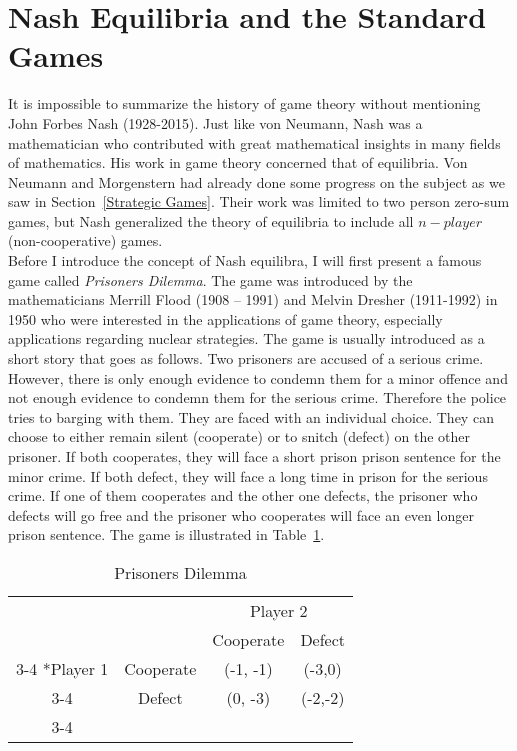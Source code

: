 \documentclass{article}
\theoremstyle{definition}
\theoremstyle{remark}
\begin{document}
\section{Nash Equilibria and the Standard Games}

It is impossible to summarize the history of game theory without
mentioning John Forbes Nash (1928-2015). Just like von Neumann, Nash
was a mathematician who contributed with great mathematical insights
in many fields of mathematics. His work in game theory concerned that
of equilibria. Von Neumann and Morgenstern had already done some
progress on the subject as we saw in Section~\ref{Strategic
  Games}. Their work was limited to two person zero-sum games, but
Nash generalized the theory of equilibria to include all $n-player$
(non-cooperative) games.\\

Before I introduce the concept of Nash equilibra, I will first present
a famous game called \emph{Prisoners Dilemma}. The game was introduced
by the mathematicians Merrill Flood (1908 – 1991) and Melvin Dresher
(1911-1992) in 1950 who were interested in the applications of game
theory, especially applications regarding nuclear
strategies. \citep{sep-prisoner-dilemma} The game is usually
introduced as a short story that goes as follows. Two prisoners are
accused of a serious crime. However, there is only enough evidence to condemn
them for a minor offence and not enough evidence to condemn them for
the serious crime. Therefore the police tries to barging with
them. They are faced with an individual choice. They can choose to
either remain silent (cooperate) or to snitch (defect) on the other
prisoner. If both cooperates, they will face a short prison prison
sentence for the minor crime. If both defect, they will face a long time in prison for
the serious crime. If one of them cooperates and the other one defects,
the prisoner who defects will go free and the prisoner who cooperates
will face an even longer prison sentence. The game is illustrated in
Table~\ref{Prisoners Dilemma}.\\

\begin{table}[h!]
  \centering
  \setlength{\extrarowheight}{2pt}
  \begin{tabular}{cc|c|c|}
    & \multicolumn{1}{c}{} & \multicolumn{2}{c}{Player 2}\\
    & \multicolumn{1}{c}{} & \multicolumn{1}{c}{Cooperate}  &
                                                              \multicolumn{1}{c}{Defect}
    \\\cline{3-4}
    \multirow{2}*{Player 1}  & Cooperate & (-1, -1) &
                                                                   (-3,0) \\\cline{3-4}
    & Defect & (0, -3) & (-2,-2) \\\cline{3-4}
  \end{tabular}
  \caption{Prisoners Dilemma}
  \label{Prisoners Dilemma}
\end{table}
\end{document}

